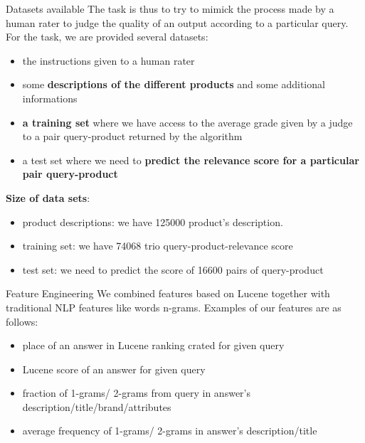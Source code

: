 \documentclass{beamer}
\newlength\postercolumnwidth
\newlength\totalwidth
\begin{document}
\begin{frame}[t]{}
\begin{columns}[totalwidth=\totalwidth]
  \begin{column}[t]{\postercolumnwidth}
    \centering
\begin{block}{Datasets available}
\small
The task is thus to try to mimick the process made by a human rater to judge the quality of an output according to a particular query. For the task, we are provided several datasets: 
\begin{itemize}
\item the instructions given to a human rater 
\item some \textbf{descriptions of the different products} and some additional informations
\item\textbf{a training set} where we have access to the average grade given by a judge to a pair query-product returned by the algorithm
\item a test set where we need to \textbf{predict the relevance score for a particular pair query-product}
\end{itemize}
\textbf{Size of data sets}:
\begin{itemize}
\item product descriptions: we have 125000 product's description. 
\item training set: we have 74068 trio query-product-relevance score
\item test set: we need to predict the score of 16600 pairs of query-product
\end{itemize}     


    \end{block}
% 
 \begin{block}{Feature Engineering}
We combined features based on Lucene together with traditional NLP features like words n-grams. Examples of our features are as follows:

\begin{itemize}

\item place of an answer in Lucene ranking crated for given query
\item Lucene score of an answer for given query
\item fraction of 1-grams/ 2-grams from query in answer's description/title/brand/attributes
\item average frequency of 1-grams/ 2-grams in answer's description/title 


\end{itemize}


\end{block}
\end{column}
\end{columns}
\end{frame}
\end{document}
